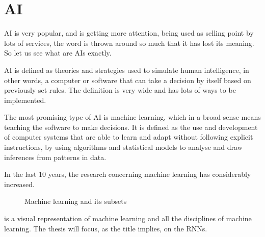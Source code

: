 \section{\acl{AI}}\label{sec:ai}

\acf{AI} is very popular, and is getting more attention, being used as selling point by lots of services, the word is thrown around so much that it has lost its meaning. So let us see what are \acp{AI} exactly.

\ac{AI} is defined as theories and strategies used to simulate human intelligence, in other words, a computer or software that can take a decision by itself based on previously set rules. The definition is very wide and has lots of ways to be implemented.

The most promising type of \ac{AI} is machine learning, which in a broad sense means teaching the software to make decisions. It is defined as the use and development of computer systems that are able to learn and adapt without following explicit instructions, by using algorithms and statistical models to analyse and draw inferences from patterns in data.

In the last 10 years, the research concerning machine learning has considerably increased.

\begin{figure}[H]
  \centering
  
  \caption{Machine learning and its subsets}
  \label{fig:ml}
\end{figure}

 is a visual representation of machine learning and all the disciplines of machine learning. The thesis will focus, as the title implies, on the \aclp{RNN}.
